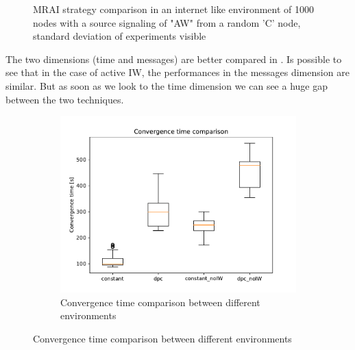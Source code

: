 \documentclass[10pt,conference,letterpaper]{IEEEtran}
\newcommand{\figwidth}{0.78}
\newcommand{\figvspace}{-1.5em}
\begin{document}
\begin{figure}[tb]
	\caption{\ac{MRAI} strategy comparison in an internet like environment of \num{1000} nodes
			 with a source signaling of "AW" from a random 'C' node, standard deviation of
			 experiments visible}
	\label{fig:s_aw_constant-dpc_mrai_1000_std}
	\vspace{\figvspace}
\end{figure}

The two dimensions (time and messages) are better compared in .
Is possible to see that in the case of active IW, the performances in the messages
dimension are similar.
But as soon as we look to the time dimension we can see a huge gap between the two
techniques.

\begin{figure}[tb]
	\centering

	\begin{subfigure}{\columnwidth}
		\centering
		\includegraphics[width=\figwidth\columnwidth]{images/internet_like/S_AW/constant-dpc-1000-comparison-30fixed_time_boxplot.pdf}
		\caption{Convergence time comparison between different environments}
		\label{fig:s_aw_dpc_vs_constant_convergence_time_1000}
		\qquad
	\end{subfigure}


\end{figure}
\end{document}
